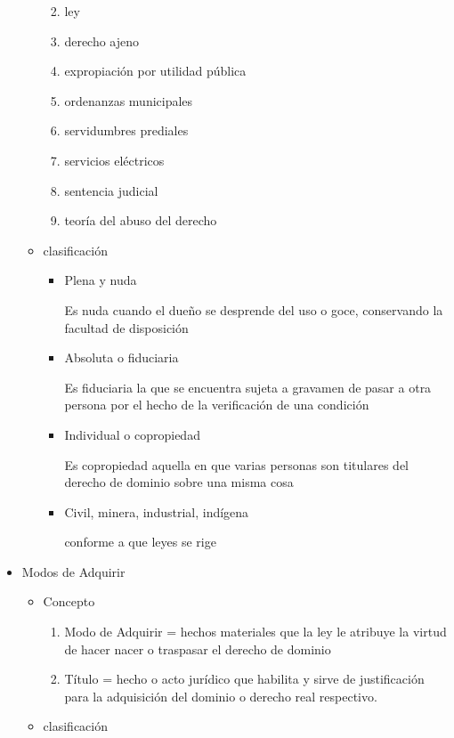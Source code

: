 \documentclass[]{article}
\providecommand{\tightlist}{%
  \setlength{\itemsep}{0pt}\setlength{\parskip}{0pt}}
\begin{document}
\begin{itemize}
\begin{itemize}
    \begin{enumerate}
    \def\labelenumi{\arabic{enumi}.}
    \tightlist
    \item
      ley
    \item
      derecho ajeno
    \item
      expropiación por utilidad pública
    \item
      ordenanzas municipales
    \item
      servidumbres prediales
    \item
      servicios eléctricos
    \item
      sentencia judicial
    \item
      teoría del abuso del derecho
    \end{enumerate}
  \item
    clasificación

    \begin{itemize}
    \item
      Plena y nuda

      Es nuda cuando el dueño se desprende del uso o goce, conservando
      la facultad de disposición
    \item
      Absoluta o fiduciaria

      Es fiduciaria la que se encuentra sujeta a gravamen de pasar a
      otra persona por el hecho de la verificación de una condición
    \item
      Individual o copropiedad

      Es copropiedad aquella en que varias personas son titulares del
      derecho de dominio sobre una misma cosa
    \item
      Civil, minera, industrial, indígena

      conforme a que leyes se rige
    \end{itemize}
  \end{itemize}
\item
  Modos de Adquirir

  \begin{itemize}
  \item
    Concepto

    \begin{enumerate}
    \def\labelenumi{\arabic{enumi}.}
    \tightlist
    \item
      Modo de Adquirir = hechos materiales que la ley le atribuye la
      virtud de hacer nacer o traspasar el derecho de dominio
    \item
      Título = hecho o acto jurídico que habilita y sirve de
      justificación para la adquisición del dominio o derecho real
      respectivo.
    \end{enumerate}
  \item
    clasificación


\end{itemize}
\end{itemize}
\end{document}
